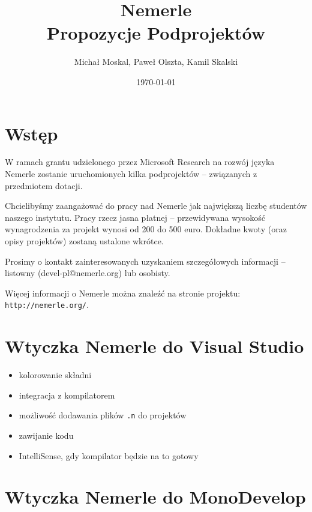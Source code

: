 \documentclass{article}
\begin{document}
\chead{}
\rhead{\thepage}
\cfoot{}
\rfoot{}
\lfoot{}
\pagestyle{fancy}

\title{ {\sc Nemerle} \\ Propozycje Podprojektów}
\author{Michał Moskal, Paweł Olszta, Kamil Skalski}
\date{\today}

\maketitle

\section{Wstęp}

W ramach grantu udzielonego przez Microsoft Research na rozwój języka Nemerle
zostanie uruchomionych kilka podprojektów -- związanych z przedmiotem
dotacji.

Chcielibyśmy zaangażować do pracy nad Nemerle jak największą liczbę studentów 
naszego instytutu. Pracy rzecz jasna płatnej -- przewidywana wysokość wynagrodzenia 
za projekt wynosi od 200 do 500 euro. Dokładne kwoty (oraz opisy projektów) 
zostaną ustalone wkrótce.

Prosimy o kontakt zainteresowanych uzyskaniem szczegółowych informacji --
listowny (devel-pl@nemerle.org) lub osobisty.

Więcej informacji o Nemerle można znaleźć na stronie projektu: \verb,http://nemerle.org/,.


\section{Wtyczka Nemerle do Visual Studio}

\begin{itemize}
\item kolorowanie składni
\item integracja z kompilatorem
\item możliwość dodawania plików \verb,.n, do projektów
\item zawijanie kodu
\item IntelliSense, gdy kompilator będzie na to gotowy
\end{itemize}


\section{Wtyczka Nemerle do MonoDevelop}
\end{document}
